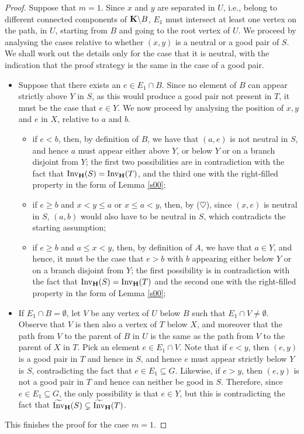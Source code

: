\documentclass{article}
\theoremstyle{plain}
\theoremstyle{definition}
\newcommand{\Invt}{\widetilde{\mathrm{Inv}}}
\newcommand{\Inv}{{\mathrm{Inv}}}
\begin{document}
\begin{proof}
Suppose that $m=1$. Since $x$ and $y$ are separated in $U$, i.e., belong to different connected components of ${\bf K}\backslash B$, $E_1$ must intersect at least one vertex on the path, in $U$, starting from $B$ and going to the root vertex of $U$. We proceed by analysing the cases relative to whether $(x,y)$ is a neutral or a good pair of $S$. We shall work out the details only for the case that it is neutral, with the indication that the proof strategy is the same in the case of a good pair. 
\begin{itemize}
\item Suppose that there exists an $e\in E_1\cap B$. Since no element of $B$ can appear strictly above $Y$ in $S$, as this would produce a good pair not present in $T$, it must be the case that $e\in Y$. We now proceed by analysing the position of $x,y$ and $e$ in $X$, relative to $a$ and $b$.
\begin{itemize}
\item if $e<b$, then, by definition of $B$, we have that $(a,e)$ is not neutral in $S$, and hence $a$ must appear either above $Y$, or below $Y$ or on a branch disjoint from $Y$; the first two possibilities are in contradiction with the fact that $\Inv_{\bf H}(S)= \Inv_{\bf H}(T)$, and the third one with the right-filled property in the form of Lemma \ref{s00};
\item if $e\geq b$ and $x<y\leq a$ or $x\leq a<y$, then, by ($\heartsuit$), since $(x,e)$ is neutral in $S$, $(a,b)$ would also have to be neutral in $S$, which contradicts the starting assumption;
\item if $e\geq b$ and $a\leq x<y$, then, by definition of $A$, we have that $a\in Y$, and hence, it must be the case that $e>b$ with $b$ appearing either below $Y$ or on a branch disjoint from $Y$; the first possibility is in contradiction with the fact that $\Inv_{\bf H}(S)= \Inv_{\bf H}(T)$ and the second one with the right-filled property in the form of Lemma \ref{s00}; 
\end{itemize}
\item If $E_1\cap B=\emptyset$, let $V$ be any vertex of $U$ below $B$ such that $E_1\cap V\neq \emptyset$. Observe that $V$ is then also a vertex of $T$ below $X$, and moreover that the path from $V$ to the parent of $B$ in $U$ is the same as the path from $V$ to the parent of $X$ in $T$. Pick an element $e\in E_1\cap V$. Note that if $e<y$, then $(e,y)$ is a good pair in $T$ and hence in $S$, and hence $e$ must appear strictly below $Y$ is $S$, contradicting the fact that $e\in E_1\subseteq G$. Likewise, if $e>y$, then $(e,y)$ is not a good pair in $T$ and hence can neither be good in $S$. Therefore, since $e\in E_1\subseteq G$, the only possibility is that $e\in Y$, but this is contradicting the fact that $\Invt_{\bf H}(S)\subsetneq \Invt_{\bf H}(T)$. 
\end{itemize}
This finishes the proof for the case $m=1$.


\end{proof}
\end{document}
